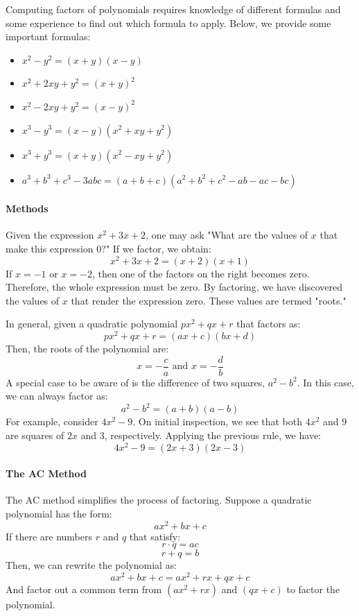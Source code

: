 Computing factors of polynomials requires knowledge of different formulas and some experience to find out which formula to apply. Below, we provide some important formulas:

\begin{itemize}
    \item $x^2 - y^2 = (x + y)(x - y)$
    \item $x^2 + 2xy + y^2 = (x + y)^2$
    \item $x^2 - 2xy + y^2 = (x - y)^2$
    \item $x^3 - y^3 = (x - y)(x^2 + xy + y^2)$
    \item $x^3 + y^3 = (x + y)(x^2 - xy + y^2)$
    \item $a^3 + b^3 + c^3 - 3abc = (a + b + c)(a^2 + b^2 + c^2 - ab - ac - bc)$
\end{itemize}

\paragraph{Methods}

Given the expression $x^2 + 3x + 2$, one may ask "What are the values of $x$ that make this expression 0?" If we factor, we obtain:
$$
x^2 + 3x + 2 = (x + 2)(x + 1)
$$
If $x = -1$ or $x = -2$, then one of the factors on the right becomes zero. Therefore, the whole expression must be zero. By factoring, we have discovered the values of $x$ that render the expression zero. These values are termed "roots."

In general, given a quadratic polynomial $px^2 + qx + r$ that factors as:
$$
px^2 + qx + r = (ax + c)(bx + d)
$$
Then, the roots of the polynomial are:
$$
x = -\frac{c}{a} \text{ and } x = -\frac{d}{b}
$$
A special case to be aware of is the difference of two squares, $a^2 - b^2$. In this case, we can always factor as:
$$
a^2 - b^2 = (a + b)(a - b)
$$
For example, consider $4x^2 - 9$. On initial inspection, we see that both $4x^2$ and $9$ are squares of $2x$ and $3$, respectively. Applying the previous rule, we have:
$$
4x^2 - 9 = (2x + 3)(2x - 3)
$$
\paragraph{The AC Method}

The AC method simplifies the process of factoring. Suppose a quadratic polynomial has the form:
$$
ax^2 + bx + c
$$
If there are numbers $r$ and $q$ that satisfy:
$$
r \cdot q = ac
$$
$$
r + q = b
$$
Then, we can rewrite the polynomial as:
$$
ax^2 + bx + c = ax^2 + rx + qx + c
$$
And factor out a common term from $(ax^2 + rx)$ and $(qx + c)$ to factor the polynomial.

